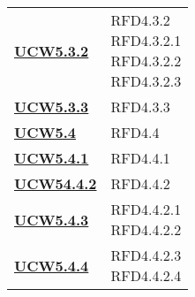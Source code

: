\begin{longtable}[H]{| >{\centering\bfseries}p{8cm} | >{\centering\arraybackslash}p{8cm} |}
    \hyperref[par:ucw5.3.2]{UCW5.3.2}  & \makecell{
        \rule{0pt}{4ex}
    RFD4.3.2                                                                                                     \\
    RFD4.3.2.1                                                                                                   \\
    RFD4.3.2.2                                                                                                   \\
    RFD4.3.2.3                                                                                                   \\
        \rule{0pt}{4ex}
    }                                                                                                            \\

    \hyperref[par:ucw5.3.3]{UCW5.3.3}  & RFD4.3.3                                                                  \\


    \hyperref[ssub:ucw5.4]{UCW5.4}     & RFD4.4                                                                    \\

    \hyperref[par:ucw5.4.1]{UCW5.4.1}  & RFD4.4.1                                                                  \\

    \hyperref[par:ucw5.4.2]{UCW54.4.2}  & RFD4.4.2                                                                  \\

    \hyperref[par:ucw5.4.3]{UCW5.4.3}  & \makecell{
        \rule{0pt}{4ex}
    RFD4.4.2.1                                                                                                   \\
    RFD4.4.2.2                                                                                                   \\
        \rule{0pt}{4ex}
    }                                                                                                            \\

    \hyperref[par:ucw5.4.4]{UCW5.4.4}  & \makecell{
        \rule{0pt}{4ex}
    RFD4.4.2.3                                                                                                   \\
    RFD4.4.2.4                                                                                                   \\
        \rule{0pt}{4ex}
    }                                                                                                            \\


\end{longtable}
